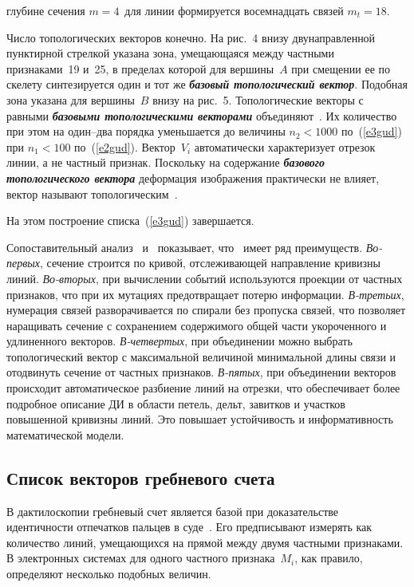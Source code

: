 \begin{multicols}{2}
\bigskip
\addtocounter{table}{1}

\noindent
 глубине сечения $m=4$\ для линии
формируется восемнадцать связей $m_t=18$.

Число топологических векторов конечно. На рис.~4 внизу двунаправленной
пунктирной стрелкой указана зона, умещающаяся между частными признаками~19 и~25, в
пределах которой для вершины~$A$ при смещении ее по скелету синтезируется один и тот же
{\bfseries\textit{базовый топологический вектор}}. Подобная зона указана для вершины~$B$
внизу на рис.~5. Топологические векторы с равными {\bfseries\textit{базовыми
топологическими векторами}} объединяют~\cite{3gud}. Их количество при этом на один--два
порядка уменьшается до величины $n_2 <1000$ по~(\ref{e3gud}) при $n_1<100$ по~(\ref{e2gud}).
Вектор~$V_i$ автоматически характеризует отрезок линии, а не частный признак. Поскольку на
содержание {\bfseries\textit{базового топологического вектора}} деформация изоб\-ра\-же\-ния
практически не влияет, вектор называют топологическим~\cite{6gud}.

На этом построение списка~(\ref{e3gud}) завершается.

Сопоставительный анализ~\cite{3gud} и~\cite{6gud} показывает, что~\cite{3gud} имеет ряд
преимуществ. \textit{Во-первых}, сечение строится по кривой, отслеживающей направление
кривизны линий. \textit{Во-вторых}, при вычислении событий используются проекции от
частных признаков, что при их мутациях предотвращает потерю информации. \textit{В-третьих},
нумерация связей разворачивается по спирали без пропуска связей, что позволяет наращивать
сечение с сохранением содержимого общей части укороченного и удлиненного векторов.
\textit{В-четвертых}, при объединении можно выбрать топологический вектор с максимальной
величиной минимальной длины связи и отодвинуть сечение от частных признаков.
\textit{В-пятых}, при объединении векторов происходит автоматическое разбиение линий на
отрезки, что обеспечивает более подробное описание ДИ в области петель, дельт, завитков и
участков повышенной кривизны линий. Это повышает устойчивость и информативность
математической модели.

\subsection{Список векторов гребневого счета} %

В дактилоскопии гребневый счет является базой при доказательстве идентичности отпечатков
пальцев в суде~\cite{5gud}. Его предписывают измерять как количество линий, умещающихся на
прямой между двумя частными признаками. В электронных системах для одного частного
признака~$M_i$, как правило, определяют несколько подобных величин.


\end{multicols}
